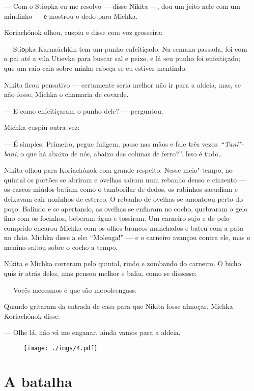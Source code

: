 --- Com o Stiopka eu me resolvo --- disse Nikita ---, dou um jeito nele
com um mindinho --- е mostrou o dedo para Michka.

Koriachónok olhou, cuspiu e disse com voz grosseira:

--- Stiоpka Karnaúchkin tem um punho enfeitiçado. Na semana passada, foi
com o pai até a vila Utievka para buscar sal e peixe, e lá seu punho foi
enfeitiçado; que um raio caia sobre minha cabeça se eu estiver mentindo.

Nikita ficou pensativo --- certamente seria melhor não ir para a aldeia,
mas, se não fosse, Michka o chamaria de covarde.

--- E como enfeitiçaram o punho dele? --- perguntou.

Michka cuspiu outra vez:

--- É simples. Primeiro, pegue fuligem, passe nas mãos e fale três
vezes: ``\emph{Tani"-bani}, o que há abaixo de nós, abaixo das colunas de
ferro?''. Isso é tudo\ldots{}

Nikita olhou para Koriachónok com grande respeito. Nesse meio"-tempo, no
quintal os portões se abriram e ovelhas saíram num rebanho denso e
cinzento --- os cascos miúdos batiam como o tamborilar de dedos, os
rabinhos sacudiam e deixavam cair nozinhos de esterco. O rebanho de
ovelhas se amontoou perto do poço. Balindo e se apertando, as ovelhas se
enfiaram no cocho, quebraram o gelo fino com os focinhos, beberam água e
tossiram. Um carneiro sujo e de pelo comprido encarou Michka com os
olhos brancos manchados e bateu com a pata no chão. Michka disse a ele:
``Molenga!'' --- e o carneiro avançou contra ele, mas o menino saltou
sobre o cocho a tempo.

Nikita e Michka correram pelo quintal, rindo e zombando do carneiro. O
bicho quis ir atrás deles, mas pensou melhor e baliu, como se dissesse:

--- Vocês meeesmos é que são moooleengass.

Quando gritaram da entrada de casa para que Nikita fosse almoçar, Michka
Koriachónok disse:

--- Olhe lá, não vá me enganar, ainda vamos para a aldeia.

\begin{figure}
\vspace*{-2.1cm}
\hspace*{-2.5cm}\texttt{[image: ./imgs/4.pdf]}
\end{figure}

\chapter{A batalha}

